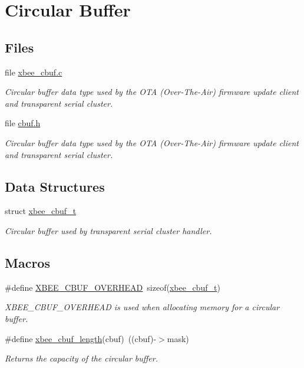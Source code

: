 \hypertarget{group__util__cbuf}{\section{Circular Buffer}
\label{group__util__cbuf}
}
\subsection*{Files}
\begin{DoxyCompactItemize}
\item 
file \hyperlink{xbee__cbuf_8c}{xbee\-\_\-cbuf.\-c}
\begin{DoxyCompactList}\small\item\em Circular buffer data type used by the O\-T\-A (Over-\/\-The-\/\-Air) firmware update client and transparent serial cluster. \end{DoxyCompactList}\item 
file \hyperlink{cbuf_8h}{cbuf.\-h}
\begin{DoxyCompactList}\small\item\em Circular buffer data type used by the O\-T\-A (Over-\/\-The-\/\-Air) firmware update client and transparent serial cluster. \end{DoxyCompactList}\end{DoxyCompactItemize}
\subsection*{Data Structures}
\begin{DoxyCompactItemize}
\item 
struct \hyperlink{structxbee__cbuf__t}{xbee\-\_\-cbuf\-\_\-t}
\begin{DoxyCompactList}\small\item\em Circular buffer used by transparent serial cluster handler. \end{DoxyCompactList}\end{DoxyCompactItemize}
\subsection*{Macros}
\begin{DoxyCompactItemize}
\item 
\#define \hyperlink{group__util__cbuf_ga6fb73f000c9aa3d2b26f3ae089676bfa}{X\-B\-E\-E\-\_\-\-C\-B\-U\-F\-\_\-\-O\-V\-E\-R\-H\-E\-A\-D}~sizeof(\hyperlink{structxbee__cbuf__t}{xbee\-\_\-cbuf\-\_\-t})
\begin{DoxyCompactList}\small\item\em X\-B\-E\-E\-\_\-\-C\-B\-U\-F\-\_\-\-O\-V\-E\-R\-H\-E\-A\-D is used when allocating memory for a circular buffer. \end{DoxyCompactList}\item 
\#define \hyperlink{group__util__cbuf_gaa3f9edea3274c2d62f09768c38fe6a1d}{xbee\-\_\-cbuf\-\_\-length}(cbuf)~((cbuf)-\/$>$mask)
\begin{DoxyCompactList}\small\item\em Returns the capacity of the circular buffer. \end{DoxyCompactList}\end{DoxyCompactItemize}
